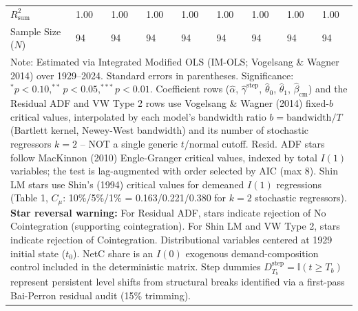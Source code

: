 \begin{table}[H]
\begin{tabular}{p{3.8cm}p{1.35cm}p{1.35cm}p{1.35cm}p{1.35cm}p{1.35cm}p{1.35cm}p{1.35cm}p{1.35cm}}
\midrule
$R^2_{\text{sum}}$ & 1.00 & 1.00 & 1.00 & 1.00 & 1.00 & 1.00 & 1.00 & 1.00  \\
Sample Size ($N$) & 94 & 94 & 94 & 94 & 94 & 94 & 94 & 94  \\
\bottomrule
\multicolumn{9}{p{13.2cm}}{\footnotesize Note: Estimated via Integrated Modified OLS (IM-OLS; Vogelsang \& Wagner 2014) over 1929--2024. Standard errors in parentheses. Significance: $^*p<0.10, ^{**}p<0.05, ^{***}p<0.01$. Coefficient rows ($\hat{\alpha}$, $\hat{\gamma}^{\text{step}}$, $\hat{\theta}_0$, $\hat{\theta}_1$, $\hat{\beta}_{\text{cm}}$) and the Residual ADF and VW Type 2 rows use Vogelsang \& Wagner (2014) fixed-$b$ critical values, interpolated by each model's bandwidth ratio $b=\text{bandwidth}/T$ (Bartlett kernel, Newey-West bandwidth) and its number of stochastic regressors $k=2$ -- NOT a single generic $t$/normal cutoff. Resid. ADF stars follow MacKinnon (2010) Engle-Granger critical values, indexed by total $I(1)$ variables; the test is lag-augmented with order selected by AIC (max 8). Shin LM stars use Shin's (1994) critical values for demeaned $I(1)$ regressions (Table 1, $C_\mu$: 10\%/5\%/1\% = 0.163/0.221/0.380 for $k=2$ stochastic regressors). \textbf{Star reversal warning:} For Residual ADF, stars indicate rejection of No Cointegration (supporting cointegration). For Shin LM and VW Type 2, stars indicate rejection of Cointegration. Distributional variables centered at 1929 initial state ($t_0$). NetC share is an $I(0)$ exogenous demand-composition control included in the deterministic matrix. Step dummies $D^{\text{step}}_{T_b} = \mathbb{I}(t \ge T_b)$ represent persistent level shifts from structural breaks identified via a first-pass Bai-Perron residual audit (15\% trimming).}
\end{tabular}
\end{table}
